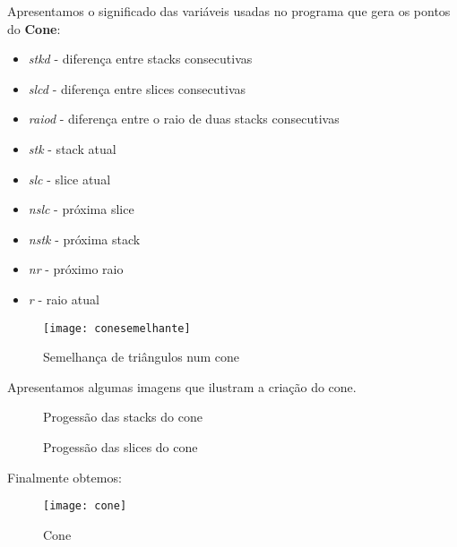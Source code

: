 \documentclass{article}
\begin{document}
\begin{info}
	Apresentamos o significado das variáveis usadas no programa que gera os pontos do \textbf{Cone}: 
	\begin{itemize}
		\item[] \textit{stkd} - diferença entre stacks consecutivas
		\item[] \textit{slcd} - diferença entre slices consecutivas
		\item[] \textit{raiod} - diferença entre o raio de duas stacks consecutivas
		\item[] \textit{stk} - stack atual 
		\item[] \textit{slc} - slice atual
		\item[] \textit{nslc} - próxima slice
		\item[] \textit{nstk} - próxima stack
		\item[] \textit{nr} - próximo raio
		\item[] \textit{r} - raio atual
	\end{itemize}
\end{info}

\begin{figure}[H]
	\centering
	\texttt{[image: conesemelhante]}
	\caption{Semelhança de triângulos num cone}
\end{figure}

Apresentamos algumas imagens que ilustram a criação do cone. \\

\begin{figure}[H]
	\centering
	\hspace{2cm}
	\caption{Progessão das stacks do cone}
\end{figure}

\begin{figure}[H]
	\centering
	\hspace{2cm}
	\caption{Progessão das slices do cone}
\end{figure}

Finalmente obtemos:

\begin{figure}[H]
	\centering
	\texttt{[image: cone]}
	\caption{Cone}
\end{figure}
\end{document}
